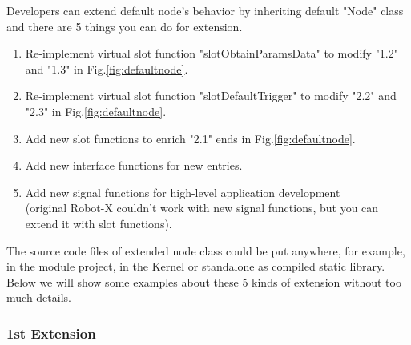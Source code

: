 \documentclass[a4paper,10pt]{book}
\begin{document}
Developers can extend default node's behavior by inheriting default "Node" class and there are 5 things you can do for extension.

\begin{enumerate}
 \item Re-implement virtual slot function "slotObtainParamsData" to modify "1.2" and "1.3" in Fig.\ref{fig:defaultnode}.
 \item Re-implement virtual slot function "slotDefaultTrigger" to modify "2.2" and "2.3" in Fig.\ref{fig:defaultnode}.
 \item Add new slot functions to enrich "2.1" ends in Fig.\ref{fig:defaultnode}.
 \item Add new interface functions for new entries.
 \item Add new signal functions for high-level application development\\ (original Robot-X couldn't work with new signal functions, but you can extend it with slot functions).
\end{enumerate}

The source code files of extended node class could be put anywhere, for example, in the module project, in the Kernel or standalone as compiled static library. Below we will show some examples about these 5 kinds of extension without too much details.

\subsubsection{1st Extension}
\end{document}
